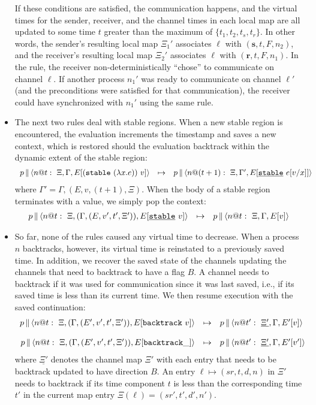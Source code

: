 \documentclass{article}
\begin{document}
\begin{itemize}
If these conditions are satisfied, the communication happens, and the virtual
times for the sender, receiver, and the channel times in each local map are
all updated to some time $t$ greater than the maximum of
$\{t_1,t_2,t_s,t_r\}$. In other words, the sender's resulting local map
$\Xi_1'$ associates $\ell$ with $(\textbf{s},t,F,n_2)$, and the receiver's
resulting local map $\Xi_2'$ associates $\ell$ with
$(\textbf{r},t,F,n_1)$. In the rule, the receiver non-deterministically
``chose'' to communicate on channel $\ell$. If another process $n_1'$ was
ready to communicate on channel $\ell'$ (and the preconditions were satisfied
for that communication), the receiver could have synchronized with $n_1'$
using the same rule.

\item The next two rules deal with stable regions. When a new stable region
  is encountered, the evaluation increments the timestamp and saves a new
  context, which is restored should the evaluation backtrack within the
  dynamic extent of the stable region:
\[\begin{array}{rcl}
  \parc{p}{\proc{n}{\Gamma}{\Xi}{E[(\stable{(\lambda x.e)})~v]}{t}} &\mapsto&
  \parc{p}{\proc{n}{\Gamma'}{\Xi}{E[\stableu{e[v/x]}]}{(t+1)}} 
\end{array}\]
where $\Gamma' = \Gamma,(E,v,(t+1),\Xi)$. When the body of a stable 
region terminates with a value, we simply pop the context:
\[\begin{array}{rcl}
  \parc{p}{\proc{n}{(\Gamma,(E,v',t',\Xi'))}{\Xi}{E[\stableu{v}]}{t}} 
  &\mapsto& 
  \parc{p}{\proc{n}{\Gamma}{\Xi}{E[v]}{t}} 
\end{array}\]

\item So far, none of the rules caused any virtual time to decrease. When a
  process $n$ backtracks, however, its virtual time is reinstated to a
  previously saved time. In addition, we recover the saved state of the
  channels updating the channels that need to backtrack to have a flag $B$. A
  channel needs to backtrack if it was used for communication since it was
  last saved, i.e., if its saved time is less than its current time. We then
  resume execution with the saved continuation:
\[\begin{array}{rcl}
  \parc{p}{\proc{n}{(\Gamma,(E',v',t',\Xi'))}{\Xi}{E[\backtrack{v}]}{t}} 
  &\mapsto& 
  \parc{p}{\proc{n}{\Gamma}{\underline{\Xi'}}{E'[v]}{t'}} \\
\\
  \parc{p}{\proc{n}{(\Gamma,(E',v',t',\Xi'))}{\Xi}{E[\abacktrack]}{t}} 
  &\mapsto& 
  \parc{p}{\proc{n}{\Gamma}{\underline{\Xi'}}{E'[v']}{t'}} 
\end{array}\]
where $\underline{\Xi'}$ denotes the channel map $\Xi'$ with each entry that
needs to be backtrack updated to have direction $B$. An entry $\ell \mapsto
(sr,t,d,n)$ in $\Xi'$ needs to backtrack if its time component $t$ is less
than the corresponding time $t'$ in the current map entry $\Xi(\ell) =
(sr',t',d',n')$.


\end{itemize}
\end{document}
